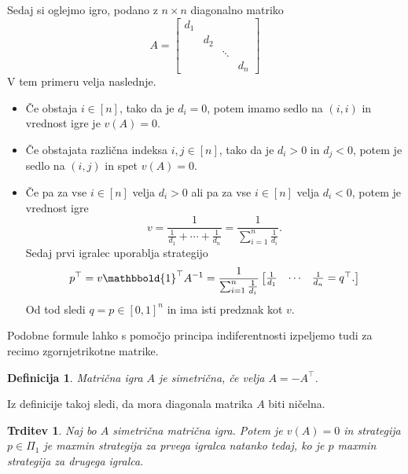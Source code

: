 \documentclass[10pt, a4paper]{article}
\newtheorem{trditev}[izr]{Trditev}
\newtheorem{defi}[izr]{Definicija}
\newenvironment{noticeB}{%
  \tcolorbox[%
  notitle,
  empty,
  enhanced,  %
  breakable,
  coltext=black,
  colback=white, 
  fontupper=\rmfamily,
  noparskip,
  sharp corners,
  boxrule=-1pt,  %
  frame hidden,
  left=7pt,  %
  right=7pt,
  top=5pt,
  bottom=5pt,
  before skip=2.5ex plus 2pt,
  after skip=2.5ex plus 2pt,
  borderline west = {1.5pt}{-0.1pt}{blue!30!black}, %
  overlay unbroken and last={%
    \draw[color=black, line width=1.25pt]
    ($(frame.south west)+(1.pt, -0.1pt)$) -- ++(2em, 0);
  }
  ]}
{\endtcolorbox}
\newenvironment{definicija}{\begin{noticeB}\begin{defi}}{%
    \end{defi}\end{noticeB}}
\begin{document}
Sedaj si oglejmo igro, podano z $n \times n$ diagonalno matriko 
$$A = \begin{bmatrix}
  d_1 &&& \\
   & d_2 && \\
   && \ddots &\\
   &&& d_n
\end{bmatrix}$$
V tem primeru velja naslednje.
\begin{itemize}
  \item Če obstaja $i \in [n]$, tako da je $d_i = 0$, potem imamo sedlo na $(i, i)$ in vrednost igre je $v(A) = 0$.
  \item Če obstajata različna indeksa $i, j \in [n]$, tako da je $d_i > 0$ in $d_j < 0$, potem je sedlo na $(i, j)$ in spet $v(A) = 0$.
  \item Če pa za vse $i \in [n]$ velja $d_i > 0$ ali pa za vse $i \in [n]$ velja $d_i < 0$, 
  potem je vrednost igre 
  $$v = \frac{1}{\frac{1}{d_1} + \cdots + \frac{1}{d_n}} = \frac{1}{\sum_{i = 1} ^n \frac{1}{d_i}}.$$
  Sedaj prvi igralec uporablja strategijo 
  $$p^\top=  v \mathbbold{1}^\top A^{-1} = \frac{1}{\sum_{i = 1} ^n \frac{1}{d_i}} \begin{bmatrix}
    \frac{1}{d_1} & \cdots & \frac{1}{d_n} = q^\top.
  \end{bmatrix}$$
  Od tod sledi $q = p \in [0, 1]^n$ in ima isti predznak kot $v$.
\end{itemize}
Podobne formule lahko s pomočjo principa indiferentnosti izpeljemo tudi za recimo zgornjetrikotne matrike.

\begin{definicija}
  Matrična igra $A$ je simetrična, če velja $A = -A^\top$.
\end{definicija}

Iz definicije takoj sledi, da mora diagonala matrika $A$ biti ničelna.

\begin{trditev}
  Naj bo $A$ simetrična matrična igra. Potem je $v(A) = 0$ in strategija 
  $p \in \Pi_1$ je maxmin strategija za prvega igralca natanko tedaj, ko je $p$
  maxmin strategija za drugega igralca.
\end{trditev}
\end{document}
